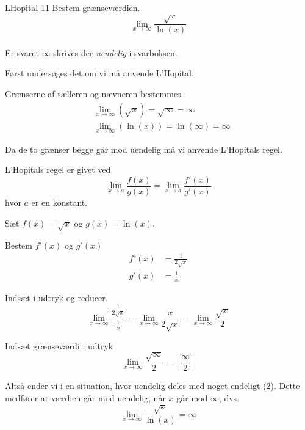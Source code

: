 \documentclass{article}
\begin{document}
\begin{exercise}{LHopital 11}
	Bestem grænseværdien.
	\[
	\lim_{x \to \infty} \frac{\sqrt{x}}{\ln(x)}
	\] 
	\\
	Er svaret $\infty$ skrives der \emph{uendelig} i svarboksen.
	
	
	\hint
	Først undersøges det om vi må anvende L'Hopital.
	
	\hint
	Grænserne af tælleren og nævneren bestemmes.
	\begin{align*}
		&\lim_{x \to \infty} (\sqrt{x}) = \sqrt{\infty} = \infty \\
		&\lim_{x \to \infty} (\ln(x)) = \ln(\infty) = \infty
	\end{align*}
	
	\hint
	Da de to grænser begge går mod uendelig må vi  anvende L'Hopitals regel. 
	
	\hint
	L'Hopitals regel er givet ved
	\[
	\lim_{x \to a} \frac{f(x)}{g(x)} = \lim_{x \to a} \frac{f'(x)}{g'(x)} 
	\]
	hvor $a$  er en konstant.
	
	\hint
	Sæt $f(x) = \sqrt{x}$ og $g(x) = \ln(x)$. 
	
	\hint
	Bestem $f'(x)$ og $g'(x)$
	\begin{align*}
		f'(x) &= \frac{1}{2\sqrt{x}} \\
		g'(x) &= \frac{1}{x}
	\end{align*}
	
	\hint
	Indsæt i udtryk og reducer. 
	\[
	\lim_{x \to \infty} \frac{ \frac{1}{2 \sqrt{x}} }{ \frac{1}{x} } = \lim_{x \to \infty} \frac{x}{2 \sqrt{x}} = 	\lim_{x \to \infty} \frac{\sqrt{x}}{2}
	\]
	
	\hint
	Indsæt grænseværdi i udtryk
	\[
	\lim_{x \to \infty} \frac{\sqrt{\infty}}{2}  = \left[ \frac{\infty}{2}  \right] 
	\]
	
	\hint
	Altså ender vi i en situation, hvor uendelig deles med noget endeligt (2). Dette medfører at værdien går mod uendelig, når $x$ går mod $\infty$, dvs.
	\[
	\lim_{x \to \infty} \frac{\sqrt{x}}{\ln(x)} = \infty
	\]
	
\end{exercise}
\end{document}
